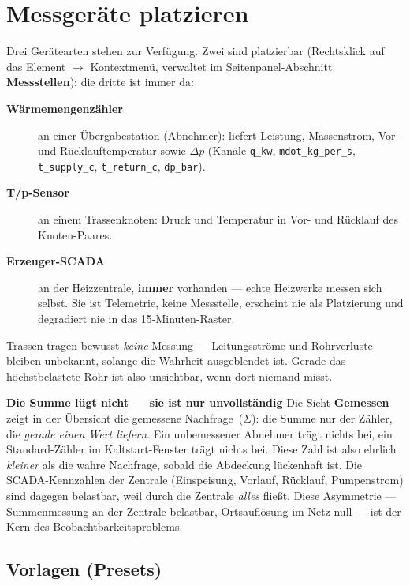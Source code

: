 \documentclass[11pt,a4paper,parskip=half]{scrreprt}
\newcommand{\ui}[1]{\textsf{\bfseries #1}}
\newenvironment{beispiel}[1][Beispiel]
  {\par\medskip{\color{bsp}\hrule height 0.8pt}\nopagebreak\smallskip
   \noindent\textbf{\textsf{\textcolor{bsp}{#1}}}\quad\ignorespaces}
  {\par\nopagebreak\smallskip{\color{bsp}\hrule height 0.8pt}\par\medskip}
\begin{document}
\section{Messgeräte platzieren}
\label{sec:messgeraete}

Drei Gerätearten stehen zur Verfügung. Zwei sind platzierbar (Rechtsklick auf
das Element $\rightarrow$ Kontextmenü, verwaltet im Seitenpanel-Abschnitt
\ui{Messstellen}); die dritte ist immer da:

\begin{description}
  \item[\ui{Wärmemengenzähler}] an einer Übergabestation (Abnehmer): liefert
    Leistung, Massenstrom, Vor- und Rücklauftemperatur sowie $\Delta p$
    (Kanäle \texttt{q\_kw}, \texttt{mdot\_kg\_per\_s}, \texttt{t\_supply\_c},
    \texttt{t\_return\_c}, \texttt{dp\_bar}).
  \item[\ui{T/p-Sensor}] an einem Trassenknoten: Druck und Temperatur in Vor-
    und Rücklauf des Knoten-Paares.
  \item[\ui{Erzeuger-SCADA}] an der Heizzentrale, \textbf{immer} vorhanden ---
    echte Heizwerke messen sich selbst. Sie ist Telemetrie, keine Messstelle,
    erscheint nie als Platzierung und degradiert nie in das 15-Minuten-Raster.
\end{description}

Trassen tragen bewusst \emph{keine} Messung --- Leitungsströme und Rohrverluste
bleiben unbekannt, solange die Wahrheit ausgeblendet ist. Gerade das
höchstbelastete Rohr ist also unsichtbar, wenn dort niemand misst.

\begin{beispiel}[Die Summe lügt nicht --- sie ist nur unvollständig]
Die Sicht \ui{Gemessen} zeigt in der Übersicht die \glqq gemessene
Nachfrage~($\Sigma$)\grqq: die Summe nur der Zähler, die \emph{gerade einen
Wert liefern}. Ein unbemessener Abnehmer trägt nichts bei, ein
Standard-Zähler im Kaltstart-Fenster trägt nichts bei. Diese Zahl ist also
ehrlich \emph{kleiner} als die wahre Nachfrage, sobald die Abdeckung
lückenhaft ist. Die SCADA-Kennzahlen der Zentrale (Einspeisung, Vorlauf,
Rücklauf, Pumpenstrom) sind dagegen belastbar, weil durch die Zentrale
\emph{alles} fließt. Diese Asymmetrie --- Summenmessung an der Zentrale
belastbar, Ortsauflösung im Netz null --- ist der Kern des
Beobachtbarkeitsproblems.
\end{beispiel}

\subsection*{Vorlagen (Presets)}
\end{document}
